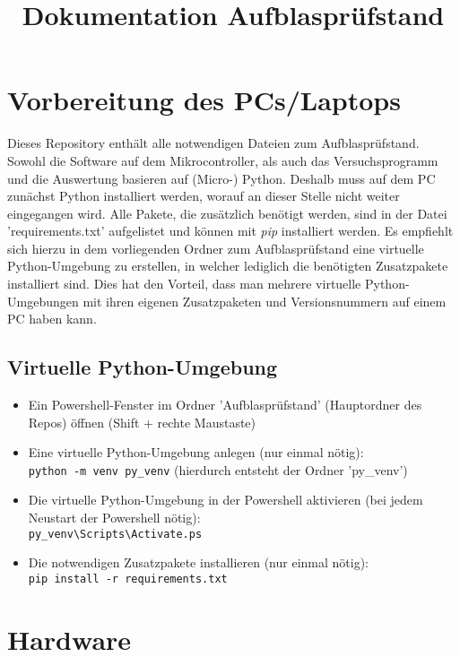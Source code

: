 \documentclass[german, 11pt]{scrartcl}
\title{Dokumentation Aufblasprüfstand}
\author{}
\begin{document}
\maketitle

\section{Vorbereitung des PCs/Laptops}
Dieses Repository enthält alle notwendigen Dateien zum Aufblasprüfstand.
Sowohl die Software auf dem Mikrocontroller, als auch das Versuchsprogramm und die Auswertung basieren auf (Micro-) Python.
Deshalb muss auf dem PC zunächst Python installiert werden, worauf an dieser Stelle nicht weiter eingegangen wird.
Alle Pakete, die zusätzlich benötigt werden, sind in der Datei 'requirements.txt' aufgelistet
und können mit \textit{pip} installiert werden.
Es empfiehlt sich hierzu in dem vorliegenden Ordner zum Aufblasprüfstand eine virtuelle Python-Umgebung zu erstellen,
in welcher lediglich die benötigten Zusatzpakete installiert sind. Dies hat den Vorteil, dass man mehrere virtuelle Python-Umgebungen
mit ihren eigenen Zusatzpaketen und Versionsnummern auf einem PC haben kann.

\subsection{Virtuelle Python-Umgebung}
\begin{itemize}
    \item Ein Powershell-Fenster im Ordner 'Aufblasprüfstand' (Hauptordner des Repos) öffnen (Shift + rechte Maustaste)
    \item Eine virtuelle Python-Umgebung anlegen (nur einmal nötig):\\
    \texttt{python -m venv py\_venv} \hfill (hierdurch entsteht der Ordner 'py\_venv')
    \item Die virtuelle Python-Umgebung in der Powershell aktivieren (bei jedem Neustart der Powershell nötig):\\
    \texttt{py\_venv\textbackslash Scripts\textbackslash Activate.ps}
    \item Die notwendigen Zusatzpakete installieren (nur einmal nötig):\\
    \texttt{pip install -r requirements.txt}
\end{itemize}

\section{Hardware}
\end{document}
